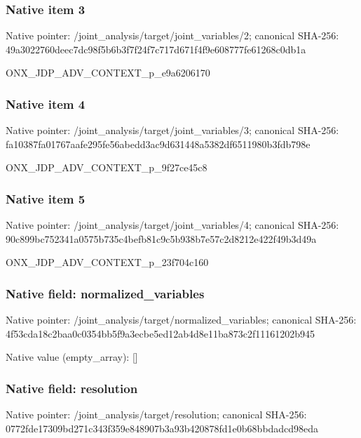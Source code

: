 \documentclass[10pt,a4paper]{article}
\begin{document}
\subsubsection{Native item 3}
Native pointer: /joint\_\allowbreak{}analysis/target/joint\_\allowbreak{}variables/2; canonical SHA-256: 49a3022760deec7dc98f5b6b3f7f24f7c717d671f4f9e608777fe61268c0db1a

\begingroup\raggedright\sloppy ONX\_\allowbreak{}JDP\_\allowbreak{}ADV\_\allowbreak{}CONTEXT\_\allowbreak{}p\_\allowbreak{}e9a6206170\par\endgroup

\subsubsection{Native item 4}
Native pointer: /joint\_\allowbreak{}analysis/target/joint\_\allowbreak{}variables/3; canonical SHA-256: fa10387fa01767aafe295fe56abedd3ac9d631448a5382df6511980b3fdb798e

\begingroup\raggedright\sloppy ONX\_\allowbreak{}JDP\_\allowbreak{}ADV\_\allowbreak{}CONTEXT\_\allowbreak{}p\_\allowbreak{}9f27ce45c8\par\endgroup

\subsubsection{Native item 5}
Native pointer: /joint\_\allowbreak{}analysis/target/joint\_\allowbreak{}variables/4; canonical SHA-256: 90c899bc752341a0575b735c4befb81c9c5b938b7e57c2d8212e422f49b3d49a

\begingroup\raggedright\sloppy ONX\_\allowbreak{}JDP\_\allowbreak{}ADV\_\allowbreak{}CONTEXT\_\allowbreak{}p\_\allowbreak{}23f704c160\par\endgroup

\subsubsection{Native field: normalized\_\allowbreak{}variables}
Native pointer: /joint\_\allowbreak{}analysis/target/normalized\_\allowbreak{}variables; canonical SHA-256: 4f53cda18c2baa0c0354bb5f9a3ecbe5ed12ab4d8e11ba873c2f11161202b945

Native value (empty\_\allowbreak{}array): []

\subsubsection{Native field: resolution}
Native pointer: /joint\_\allowbreak{}analysis/target/resolution; canonical SHA-256: 0772fde17309bd271c343f359e848907b3a93b420878fd1e0b68bbdadcd98eda
\end{document}
